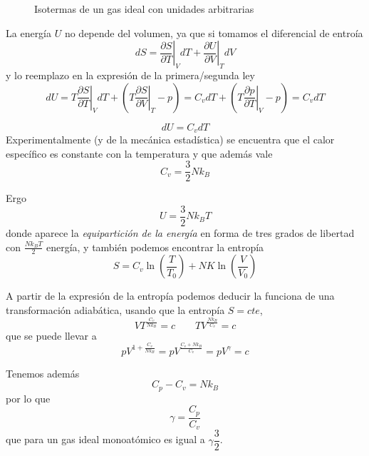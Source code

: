 \documentclass{book}
\numberwithin{equation}{section} %
\begin{document}
\begin{figure}[H]
\centering
\caption{Isotermas de un gas ideal con unidades arbitrarias}
\label{fig:gas_ideal_isotermas}
\end{figure}

La energía $U$ no depende del volumen, ya que si tomamos el diferencial de entroía
\[ dS = \left.\frac{\partial S}{\partial T}\right|_V dT + \left.\frac{\partial U}{\partial V}\right|_T dV\]
y lo reemplazo en la expresión de la primera/segunda ley
\[ dU = T \left.\frac{\partial S}{\partial T}\right|_V dT + \left( T \left.\frac{\partial S}{\partial V}\right|_T - p \right) = C_v dT + \left( T \left.\frac{\partial p}{\partial T}\right|_V - p \right) = C_v dT \]

\begin{equation}
    dU = C_v dT
    \label{eq:gas_ideal_energia}
\end{equation}
Experimentalmente (y de la mecánica estadística) se encuentra que el calor específico es constante con la temperatura y que además vale
\begin{equation}
    C_v = \frac{3}{2} N k_B
    \label{eq:gas_ideal_cv}
\end{equation}

Ergo
\begin{equation}
    U = \frac{3}{2} N k_B T
\end{equation}
donde aparece la \emph{equipartición de la energía} en forma de tres grados de libertad con $\frac{N k_B T}{2}$ energía, y también podemos encontrar la entropía
\begin{equation}
    S = C_v \ln\left(\frac{T}{T_0}\right) + N K \ln\left(\frac{V}{V_0}\right)
\end{equation}

A partir de la expresión de la entropía podemos deducir la funciona de una transformación adiabática, usando que la entropía $S = cte$,
\begin{equation}
    V T^{\frac{C_v}{N k_B}} = c \qquad T V^{\frac{N k_B}{C_v}} = c
\end{equation}
que se puede llevar a
\begin{equation}
    p V^{1 + \frac{C_v}{N k_B}} = p V^{\frac{C_v + N k_B}{C_v}} = p V^{\gamma} = c
    \label{eq:gas_ideal_adiabaticas}
\end{equation}

Tenemos además
\begin{equation}
    C_p - C_v = N k_B
\end{equation}
por lo que
\begin{equation}
    \gamma = \frac{C_p}{C_v}
\end{equation}
que para un gas ideal monoatómico es igual a $\gamma \dfrac{3}{2}$.
\end{document}
